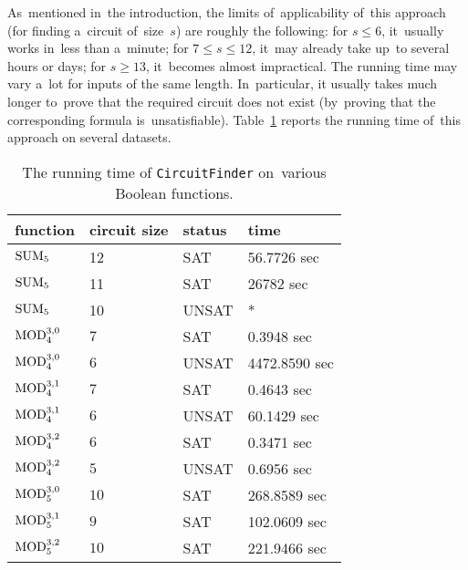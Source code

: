 As~mentioned in~the introduction, the limits
of~applicability of~this approach (for finding a~circuit
of~size~$s$) are roughly the following:
for $s \le 6$, it~usually works in~less than a~minute;
for $7 \le s \le 12$, it~may already take up~to
several hours or days; for $s \ge 13$, it~becomes almost impractical. The running time may vary a~lot
for inputs of the same length. In~particular,
it usually takes much longer to~prove that
the required circuit does not exist (by~proving that the corresponding formula is~unsatisfiable). Table~\ref{table:runningtimes} reports the running time 
of~this approach on several datasets.

\begin{table}[ht]
\begin{center}
\begin{tabular}{llll}
\toprule
function & circuit size & status & time\\
\midrule
$\operatorname{SUM}_5$ & 12 & SAT & 56.7726 sec\\
$\operatorname{SUM}_5$ & 11 & SAT & 26782 sec\\
$\operatorname{SUM}_5$ & 10 & UNSAT & * \\
$\operatorname{MOD}_4^{3,0}$ & $7$ & SAT & 0.3948 sec\\
$\operatorname{MOD}_4^{3,0}$ & $6$ & UNSAT & 4472.8590 sec\\
$\operatorname{MOD}_4^{3,1}$ & $7$ & SAT & 0.4643 sec\\
$\operatorname{MOD}_4^{3,1}$ & $6$ & UNSAT & 60.1429 sec\\
$\operatorname{MOD}_4^{3,2}$ & $6$ & SAT & 0.3471 sec\\
$\operatorname{MOD}_4^{3,2}$ & $5$ & UNSAT & 0.6956 sec\\

$\operatorname{MOD}_5^{3,0}$ & $10$ & SAT & 268.8589 sec\\
$\operatorname{MOD}_5^{3,1}$ & $9$ & SAT & 102.0609 sec\\
$\operatorname{MOD}_5^{3,2}$ & $10$ & SAT & 221.9466 sec\\
\bottomrule
\end{tabular}
\end{center}
\caption{The running time of \texttt{CircuitFinder} on~various Boolean functions.} \label{table:runningtimes}
\end{table}



